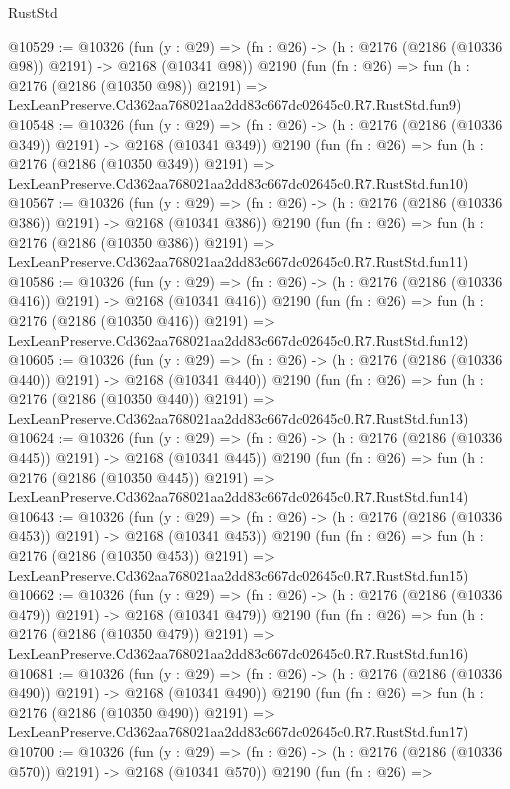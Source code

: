 \begin{lexlean}{RustStd}
\begin{coremodule}
@10529 := @10326
    (fun (y : @29) => (fn : @26) -> (h : @2176 (@2186 (@10336 @98)) @2191) -> @2168 (@10341 @98))
    @2190
    (fun (fn : @26) =>
    fun (h : @2176 (@2186 (@10350 @98)) @2191) =>
    LexLeanPreserve.Cd362aa768021aa2dd83c667dc02645c0.R7.RustStd.fun9)
@10548 := @10326
    (fun (y : @29) => (fn : @26) -> (h : @2176 (@2186 (@10336 @349)) @2191) -> @2168 (@10341 @349))
    @2190
    (fun (fn : @26) =>
    fun (h : @2176 (@2186 (@10350 @349)) @2191) =>
    LexLeanPreserve.Cd362aa768021aa2dd83c667dc02645c0.R7.RustStd.fun10)
@10567 := @10326
    (fun (y : @29) => (fn : @26) -> (h : @2176 (@2186 (@10336 @386)) @2191) -> @2168 (@10341 @386))
    @2190
    (fun (fn : @26) =>
    fun (h : @2176 (@2186 (@10350 @386)) @2191) =>
    LexLeanPreserve.Cd362aa768021aa2dd83c667dc02645c0.R7.RustStd.fun11)
@10586 := @10326
    (fun (y : @29) => (fn : @26) -> (h : @2176 (@2186 (@10336 @416)) @2191) -> @2168 (@10341 @416))
    @2190
    (fun (fn : @26) =>
    fun (h : @2176 (@2186 (@10350 @416)) @2191) =>
    LexLeanPreserve.Cd362aa768021aa2dd83c667dc02645c0.R7.RustStd.fun12)
@10605 := @10326
    (fun (y : @29) => (fn : @26) -> (h : @2176 (@2186 (@10336 @440)) @2191) -> @2168 (@10341 @440))
    @2190
    (fun (fn : @26) =>
    fun (h : @2176 (@2186 (@10350 @440)) @2191) =>
    LexLeanPreserve.Cd362aa768021aa2dd83c667dc02645c0.R7.RustStd.fun13)
@10624 := @10326
    (fun (y : @29) => (fn : @26) -> (h : @2176 (@2186 (@10336 @445)) @2191) -> @2168 (@10341 @445))
    @2190
    (fun (fn : @26) =>
    fun (h : @2176 (@2186 (@10350 @445)) @2191) =>
    LexLeanPreserve.Cd362aa768021aa2dd83c667dc02645c0.R7.RustStd.fun14)
@10643 := @10326
    (fun (y : @29) => (fn : @26) -> (h : @2176 (@2186 (@10336 @453)) @2191) -> @2168 (@10341 @453))
    @2190
    (fun (fn : @26) =>
    fun (h : @2176 (@2186 (@10350 @453)) @2191) =>
    LexLeanPreserve.Cd362aa768021aa2dd83c667dc02645c0.R7.RustStd.fun15)
@10662 := @10326
    (fun (y : @29) => (fn : @26) -> (h : @2176 (@2186 (@10336 @479)) @2191) -> @2168 (@10341 @479))
    @2190
    (fun (fn : @26) =>
    fun (h : @2176 (@2186 (@10350 @479)) @2191) =>
    LexLeanPreserve.Cd362aa768021aa2dd83c667dc02645c0.R7.RustStd.fun16)
@10681 := @10326
    (fun (y : @29) => (fn : @26) -> (h : @2176 (@2186 (@10336 @490)) @2191) -> @2168 (@10341 @490))
    @2190
    (fun (fn : @26) =>
    fun (h : @2176 (@2186 (@10350 @490)) @2191) =>
    LexLeanPreserve.Cd362aa768021aa2dd83c667dc02645c0.R7.RustStd.fun17)
@10700 := @10326
    (fun (y : @29) => (fn : @26) -> (h : @2176 (@2186 (@10336 @570)) @2191) -> @2168 (@10341 @570))
    @2190
    (fun (fn : @26) =>

\end{coremodule}
\end{lexlean}
